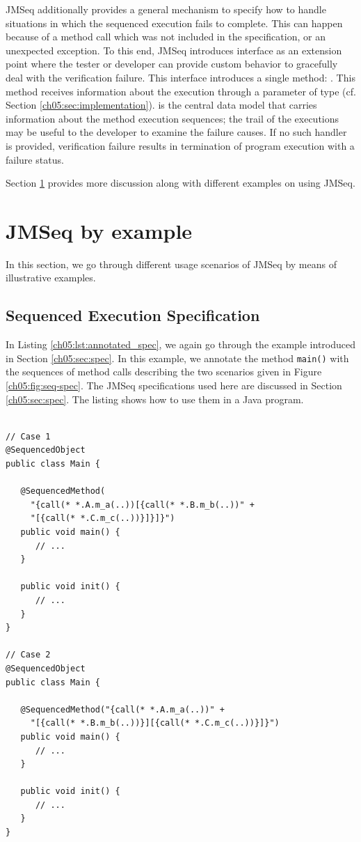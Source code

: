 JMSeq additionally provides a general mechanism to specify how to handle situations in
which the sequenced execution fails to complete. This can happen
because of a method call which was not included in the specification, or
an unexpected exception.
To this end, JMSeq introduces  interface as an
extension point where the tester or developer can provide 
custom behavior to gracefully deal with the verification failure.
This interface
introduces a single method: . 
This method
receives information about the execution through a parameter of
type  (cf. Section \ref{ch05:sec:implementation}).
 is the central data model that carries information
about the method execution sequences; the trail of the
executions may be useful to the developer to examine the failure causes.
%
If no such handler is provided, verification failure results in termination 
of program execution with a failure status.

Section \ref{ch05:sec:samples} provides more discussion along with different
examples on using JMSeq.

\section{JMSeq by example} \label{ch05:sec:samples}
In this section, we go through different usage scenarios of JMSeq 
by means of illustrative examples.

\subsection{Sequenced Execution Specification}
In  Listing \ref{ch05:lst:annotated_spec}, we again go through the example
introduced in Section \ref{ch05:sec:spec}.
In this example, we annotate the method \texttt{main()} with the sequences of method calls describing the two scenarios
given in Figure \ref{ch05:fig:seq-spec}. 
The JMSeq specifications used here are discussed in Section \ref{ch05:sec:spec}.
The listing shows how to use them in a Java program.

\lstset{language=Java}
\begin{lstlisting}[label=ch05:lst:annotated_spec, caption=Sample annotated specification]

// Case 1
@SequencedObject
public class Main {

   @SequencedMethod(
     "{call(* *.A.m_a(..))[{call(* *.B.m_b(..))" + 
     "[{call(* *.C.m_c(..))}]}]}") 
   public void main() { 
      // ...
   }
   
   public void init() {
      // ...
   }
}

// Case 2
@SequencedObject
public class Main {

   @SequencedMethod("{call(* *.A.m_a(..))" + 
     "[{call(* *.B.m_b(..))}][{call(* *.C.m_c(..))}]}") 
   public void main() {
      // ...
   }
   
   public void init() {
      // ...
   }
}
\end{lstlisting}

